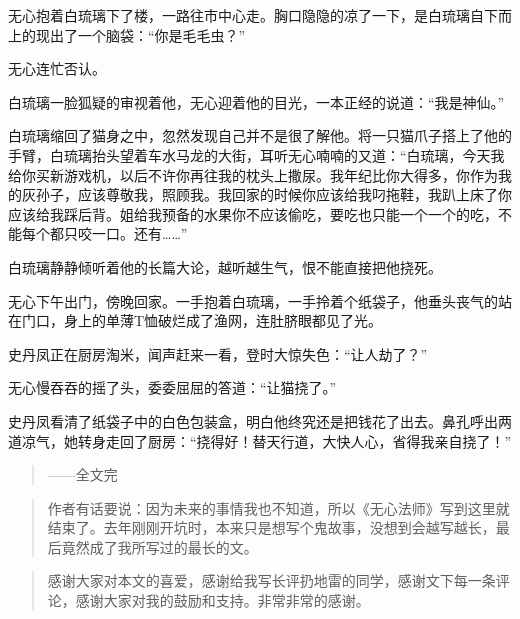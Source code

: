 无心抱着白琉璃下了楼，一路往市中心走。胸口隐隐的凉了一下，是白琉璃自下而上的现出了一个脑袋：``你是毛毛虫？''

无心连忙否认。

白琉璃一脸狐疑的审视着他，无心迎着他的目光，一本正经的说道：``我是神仙。''

白琉璃缩回了猫身之中，忽然发现自己并不是很了解他。将一只猫爪子搭上了他的手臂，白琉璃抬头望着车水马龙的大街，耳听无心喃喃的又道：``白琉璃，今天我给你买新游戏机，以后不许你再往我的枕头上撒尿。我年纪比你大得多，你作为我的灰孙子，应该尊敬我，照顾我。我回家的时候你应该给我叼拖鞋，我趴上床了你应该给我踩后背。姐给我预备的水果你不应该偷吃，要吃也只能一个一个的吃，不能每个都只咬一口。还有\ldots{}\ldots{}''

白琉璃静静倾听着他的长篇大论，越听越生气，恨不能直接把他挠死。

无心下午出门，傍晚回家。一手抱着白琉璃，一手拎着个纸袋子，他垂头丧气的站在门口，身上的单薄T恤破烂成了渔网，连肚脐眼都见了光。

史丹凤正在厨房淘米，闻声赶来一看，登时大惊失色：``让人劫了？''

无心慢吞吞的摇了头，委委屈屈的答道：``让猫挠了。''

史丹凤看清了纸袋子中的白色包装盒，明白他终究还是把钱花了出去。鼻孔呼出两道凉气，她转身走回了厨房：``挠得好！替天行道，大快人心，省得我亲自挠了！''

\begin{quote}
——全文完
\end{quote}

\begin{quote}
\end{quote}

\begin{quote}
作者有话要说：因为未来的事情我也不知道，所以《无心法师》写到这里就结束了。去年刚刚开坑时，本来只是想写个鬼故事，没想到会越写越长，最后竟然成了我所写过的最长的文。
\end{quote}

\begin{quote}
感谢大家对本文的喜爱，感谢给我写长评扔地雷的同学，感谢文下每一条评论，感谢大家对我的鼓励和支持。非常非常的感谢。
\end{quote}
